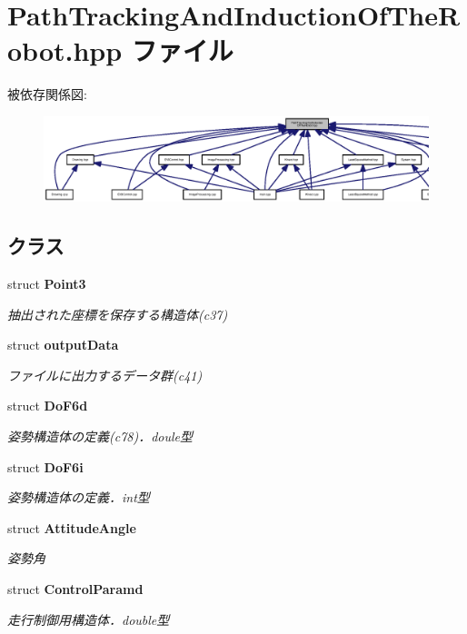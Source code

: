 \section{Path\-Tracking\-And\-Induction\-Of\-The\-Robot.\-hpp ファイル}
\label{_path_tracking_and_induction_of_the_robot_8hpp}
被依存関係図\-:\nopagebreak
\begin{figure}[H]
\begin{center}
\leavevmode
\includegraphics[width=350pt]{_path_tracking_and_induction_of_the_robot_8hpp__dep__incl}
\end{center}
\end{figure}
\subsection*{クラス}
\begin{DoxyCompactItemize}
\item 
struct {\bf Point3}
\begin{DoxyCompactList}\small\item\em 抽出された座標を保存する構造体(c37) \end{DoxyCompactList}\item 
struct {\bf output\-Data}
\begin{DoxyCompactList}\small\item\em ファイルに出力するデータ群(c41) \end{DoxyCompactList}\item 
struct {\bf Do\-F6d}
\begin{DoxyCompactList}\small\item\em 姿勢構造体の定義(c78)．doule型 \end{DoxyCompactList}\item 
struct {\bf Do\-F6i}
\begin{DoxyCompactList}\small\item\em 姿勢構造体の定義．int型 \end{DoxyCompactList}\item 
struct {\bf Attitude\-Angle}
\begin{DoxyCompactList}\small\item\em 姿勢角 \end{DoxyCompactList}\item 
struct {\bf Control\-Paramd}
\begin{DoxyCompactList}\small\item\em 走行制御用構造体．double型 \end{DoxyCompactList}\end{DoxyCompactItemize}
